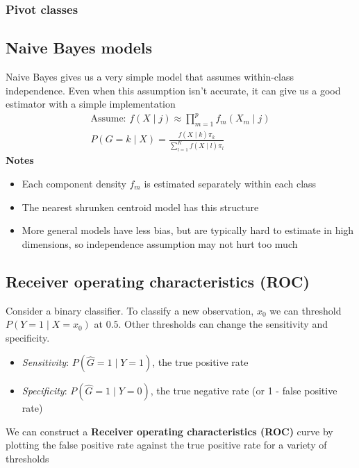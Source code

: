\documentclass{article}
\begin{document}
\subsubsection{Pivot classes}


\subsection{Naive Bayes models}
Naive Bayes gives us a very simple model that assumes within-class independence. Even when this assumption isn't accurate, it can give us a good estimator with a simple implementation
\begin{align*}
  \textrm{Assume: } f(X\mid j) \approx \prod_{m=1}^p f_m(X_m\mid j)\\
  P(G=k \mid X) = \frac{f(X\mid k)\pi_k}{\sum_{l=1}^Kf(X\mid l)\pi_l}
\end{align*}
\textbf{Notes}
\begin{itemize}
  \item Each component density $f_m$ is estimated separately within each class
  \item The nearest shrunken centroid model has this structure
  \item More general models have less bias, but are typically hard to estimate in high dimensions, so independence assumption may not hurt too much
\end{itemize}


\subsection{Receiver operating characteristics (ROC)}
Consider a binary classifier. To classify a new observation, $x_0$ we can threshold $P(Y=1\mid X=x_0)$ at $0.5$. Other thresholds can change the sensitivity and specificity.
\begin{itemize}
  \item \textit{Sensitivity}: $P(\hat{G}=1 \mid Y=1)$, the true positive rate
  \item \textit{Specificity}: $P(\hat{G}=1 \mid Y=0)$, the true negative rate (or 1 - false positive rate)
\end{itemize}
We can construct a \textbf{Receiver operating characteristics (ROC)} curve by plotting the false positive rate against the true positive rate for a variety of thresholds
\end{document}
